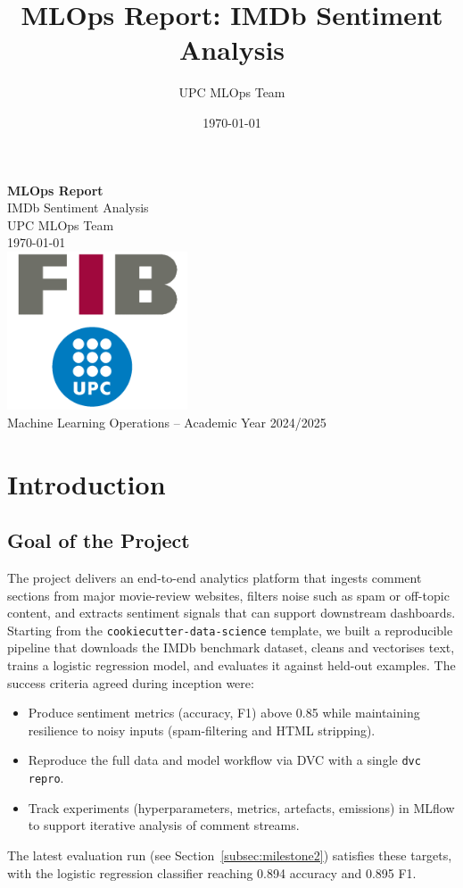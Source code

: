 \documentclass[11pt,a4paper]{article}
\title{MLOps Report: IMDb Sentiment Analysis}
\author{UPC MLOps Team}
\date{\today}
\begin{document}
\begin{titlepage}
  \centering
  \vspace*{3cm}
  {\Huge \textbf{MLOps Report}}\\[0.8cm]
  {\LARGE IMDb Sentiment Analysis}\\[1.5cm]
  {\Large UPC MLOps Team}\\[0.5cm]
  {\large \today}\\[4cm]
  \includegraphics[width=0.4\textwidth]{fib-upc-logo.png}\\[1cm]
  {\large Machine Learning Operations -- Academic Year 2024/2025}
\end{titlepage}

\tableofcontents
\newpage

\section{Introduction}
\subsection{Goal of the Project}
The project delivers an end-to-end analytics platform that ingests comment sections from major movie-review websites, filters noise such as spam or off-topic content, and extracts sentiment signals that can support downstream dashboards. Starting from the \texttt{cookiecutter-data-science} template, we built a reproducible pipeline that downloads the IMDb benchmark dataset, cleans and vectorises text, trains a logistic regression model, and evaluates it against held-out examples. The success criteria agreed during inception were:\begin{itemize}[leftmargin=*]
  \item Produce sentiment metrics (accuracy, F1) above 0.85 while maintaining resilience to noisy inputs (spam-filtering and HTML stripping).
  \item Reproduce the full data and model workflow via DVC with a single \texttt{dvc repro}.
  \item Track experiments (hyperparameters, metrics, artefacts, emissions) in MLflow to support iterative analysis of comment streams.
\end{itemize}
The latest evaluation run (see Section~\ref{subsec:milestone2}) satisfies these targets, with the logistic regression classifier reaching 0.894 accuracy and 0.895 F1.
\end{document}
